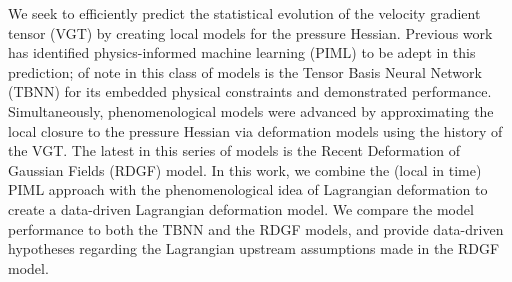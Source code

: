 We seek to efficiently predict the statistical evolution of the velocity gradient tensor (VGT) by creating local models for the pressure Hessian. Previous work has identified physics-informed machine learning (PIML) to be adept in this prediction; of note in this class of models is the Tensor Basis Neural Network (TBNN) for its embedded physical constraints and demonstrated performance. Simultaneously, phenomenological models were advanced by approximating the local closure to the pressure Hessian via deformation models using the history of the VGT. The latest in this series of models is the Recent Deformation of Gaussian Fields (RDGF) model. In this work, we combine the (local in time) PIML approach with the phenomenological idea of Lagrangian deformation to create a data-driven Lagrangian deformation model. We compare the model performance to both the TBNN and the RDGF models, and provide data-driven hypotheses regarding the Lagrangian upstream assumptions made in the RDGF model.
